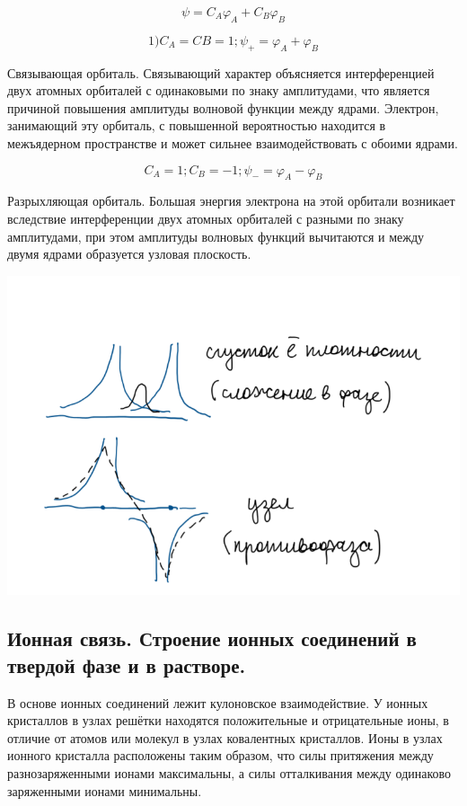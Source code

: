 \documentclass[14pt,a4paper]{scrartcl}
\begin{document}
$$\psi = C_A\varphi_A + C_B\varphi_B$$

$$1) C_A =  CB= 1;  \psi_+ = \varphi_A + \varphi_B$$

Связывающая орбиталь. Связывающий характер объясняется интерференцией двух атомных орбиталей с одинаковыми по знаку амплитудами, что является причиной повышения амплитуды волновой функции между ядрами. Электрон, занимающий эту орбиталь, с повышенной вероятностью находится в межъядерном пространстве и может сильнее взаимодействовать с обоими ядрами.

$$C_A =1; C_B = -1; \psi_- = \varphi_A-\varphi_B$$

Разрыхляющая орбиталь. Большая энергия электрона на этой орбитали
возникает вследствие интерференции двух атомных орбиталей с разными по
знаку амплитудами, при этом амплитуды волновых функций вычитаются и
между двумя ядрами образуется узловая плоскость.

\includegraphics[scale=0.7]{1v.png}

\subsection{\textbf{Ионная связь. Строение ионных соединений в твердой фазе и в растворе.}}

В основе ионных соединений лежит кулоновское взаимодействие. У
ионных кристаллов в узлах решётки находятся положительные и
отрицательные ионы, в отличие от атомов или молекул в узлах
ковалентных кристаллов. Ионы в узлах ионного кристалла
расположены таким образом, что силы притяжения между
разнозаряженными ионами максимальны, а силы отталкивания
между одинаково заряженными ионами минимальны. 
\end{document}
